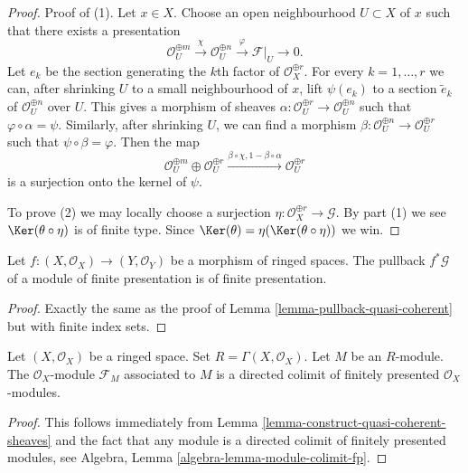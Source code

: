 \begin{proof}
Proof of (1).
Let $x \in X$. Choose an open neighbourhood $U \subset X$ of $x$
such that there exists a presentation
$$
\mathcal{O}_U^{\oplus m}
\xrightarrow{\chi}
\mathcal{O}_U^{\oplus n}
\xrightarrow{\varphi}
\mathcal{F}|_U
\to
0.
$$
Let $e_k$ be the section generating the $k$th factor of
$\mathcal{O}_X^{\oplus r}$. For every $k = 1, \ldots, r$
we can, after shrinking $U$ to a small neighbourhood of $x$,
lift $\psi(e_k)$ to a section $\tilde e_k$ of
$\mathcal{O}_U^{\oplus n}$ over $U$. This gives a morphism
of sheaves $\alpha : \mathcal{O}_U^{\oplus r} \to \mathcal{O}_U^{\oplus n}$
such that $\varphi \circ \alpha = \psi$.
Similarly, after shrinking $U$, we can find a morphism
$\beta : \mathcal{O}_U^{\oplus n} \to \mathcal{O}_U^{\oplus r}$
such that $\psi \circ \beta = \varphi$. Then the map
$$
\mathcal{O}_U^{\oplus m} \oplus
\mathcal{O}_U^{\oplus r}
\xrightarrow{\beta \circ \chi, 1 - \beta \circ \alpha}
\mathcal{O}_U^{\oplus r}
$$
is a surjection onto the kernel of $\psi$.

\medskip\noindent
To prove (2) we may locally choose a surjection
$\eta : \mathcal{O}_X^{\oplus r} \to \mathcal{G}$.
By part (1) we see $\Ker(\theta \circ \eta)$ is of finite type.
Since $\Ker(\theta) = \eta(\Ker(\theta \circ \eta))$ we win.
\end{proof}

\begin{lemma}
\label{lemma-pullback-finite-presentation}
Let $f : (X, \mathcal{O}_X) \to (Y, \mathcal{O}_Y)$
be a morphism of ringed spaces.
The pullback $f^*\mathcal{G}$ of a module of finite presentation
is of finite presentation.
\end{lemma}

\begin{proof}
Exactly the same as the proof of Lemma \ref{lemma-pullback-quasi-coherent}
but with finite index sets.
\end{proof}

\begin{lemma}
\label{lemma-quasi-coherent-limit-finite-presentation}
Let $(X, \mathcal{O}_X)$ be a ringed space.
Set $R = \Gamma(X, \mathcal{O}_X)$.
Let $M$ be an $R$-module.
The $\mathcal{O}_X$-module $\mathcal{F}_M$ associated to $M$
is a directed colimit of finitely presented $\mathcal{O}_X$-modules.
\end{lemma}

\begin{proof}
This follows immediately from
Lemma \ref{lemma-construct-quasi-coherent-sheaves}
and the fact that any module is a directed colimit
of finitely presented modules, see
Algebra, Lemma \ref{algebra-lemma-module-colimit-fp}.
\end{proof}

